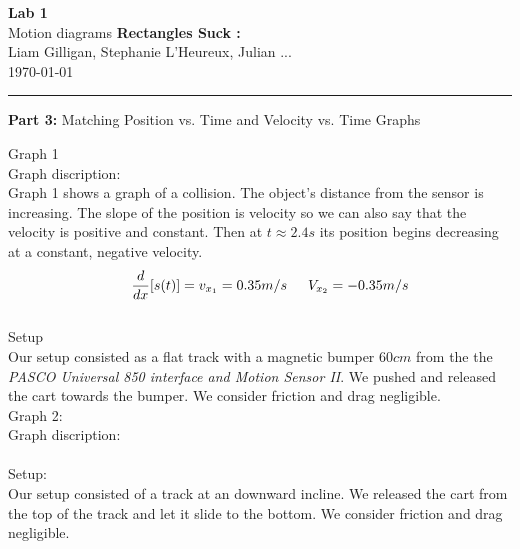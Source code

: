 \documentclass[12pt, letterpaper]{article}
\begin{document}
  \begin{titlepage} 
    \begin{center}
      \Huge{\textbf{Lab 1}}\\
      \Huge{Motion diagrams}
      \vfill
      \large{\textbf{Rectangles Suck :}}\\
      \large{Liam Gilligan, Stephanie L'Heureux, Julian ...}\\
      \vspace*{0.5cm}
      \normalsize
      \today
    \end{center}
  \end{titlepage}


  \begin{center}
    \rule{\textwidth}{0.5pt}
    \normalsize{\textbf{Part 3:} Matching Position vs. Time and Velocity vs. Time Graphs}\\
    \vspace{0.5cm}
  \end{center}

  \noindent{}\large{Graph 1}\\
  \large{Graph discription:}\\
  \noindent{}Graph 1 shows a graph of a collision. The object's distance from the sensor 
  is increasing. The slope of the position is velocity so we can also say 
  that the velocity is positive and constant. Then at $t\approx2.4s$ its position
  begins decreasing at a constant, negative velocity.\\ 
  \begin{equation} 
    \indent{} \frac{d}{dx}[s(t)] =  v_{x_1} = 0.35m/s
    \indent{}V_{x_2}= -0.35m/s
  \end{equation}\\
  \noindent{}\large{Setup}\\
  \noindent{}Our setup consisted as a flat track with a magnetic bumper $60cm$ from the
  the \emph{PASCO Universal 850 interface and Motion Sensor II}. We pushed and released the cart towards the bumper. 
  We consider friction and drag negligible.\\

  \noindent{}\large{Graph 2:}\\
  \large{Graph discription:}\\
  \\
  \large{Setup:}\\
  Our setup consisted of a track at an downward incline. We released the cart from the 
  top of the track and let it slide to the bottom. We consider friction and drag negligible.\\
\end{document}
